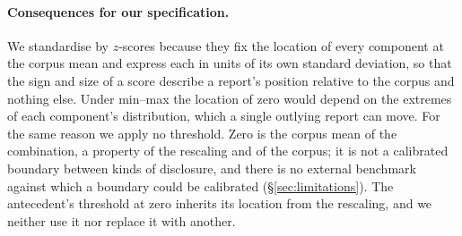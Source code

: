 \paragraph{Consequences for our specification.} We standardise by $z$-scores
because they fix the location of every component at the corpus mean and
express each in units of its own standard deviation, so that the sign and size
of a score describe a report's position relative to the corpus and nothing
else. Under min--max the location of zero would depend on the extremes of each
component's distribution, which a single outlying report can move. For the
same reason we apply no threshold. Zero is the corpus mean of the combination,
a property of the rescaling and of the corpus; it is not a calibrated boundary
between kinds of disclosure, and there is no external benchmark against which
a boundary could be calibrated (\S\ref{sec:limitations}). The antecedent's
threshold at zero inherits its location from the rescaling, and we neither use
it nor replace it with another.
